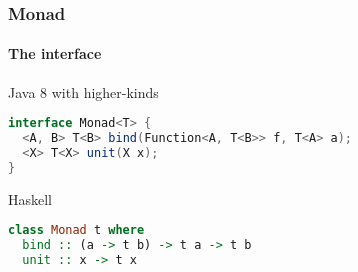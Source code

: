 \begin{frame}[fragile]
\frametitle{Monad}
\framesubtitle{The interface}
\begin{block}{Java 8 with higher-kinds}
\begin{lstlisting}[style=language,language=java]
interface Monad<T> {
  <A, B> T<B> bind(Function<A, T<B>> f, T<A> a);
  <X> T<X> unit(X x);
}
\end{lstlisting}
\end{block}
\begin{block}{Haskell}
\begin{lstlisting}[style=language,language=haskell]
class Monad t where
  bind :: (a -> t b) -> t a -> t b
  unit :: x -> t x
\end{lstlisting}
\end{block}
\end{frame}

